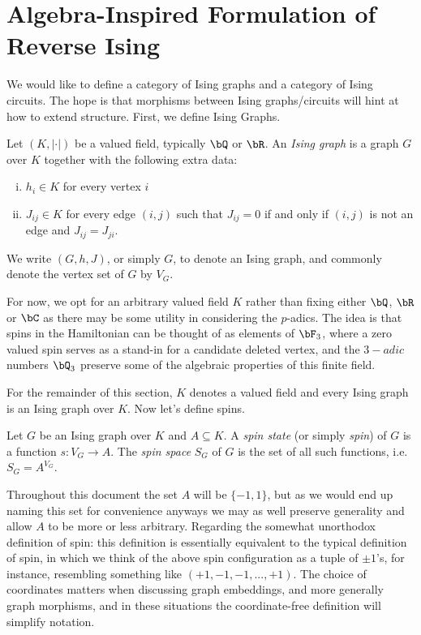 \section*{Algebra-Inspired Formulation of Reverse Ising}
We would like to define a category of Ising graphs and a category of Ising circuits. The hope is that morphisms between Ising graphs/circuits will hint at how to extend structure. First, we define Ising Graphs.
\begin{defn}\label{defn:ising-graph}
	Let $(K,|\cdot|)$ be a valued field, typically $\bQ$ or $\bR$. An \emph{Ising graph} is a graph $G$ over $K$ together with the following extra data:
	\begin{enumerate}[(i)]
		\item $h_i \in K$ for every vertex $i$
		\item $J_{ij} \in K$ for every edge $(i,j)$ such that $J_{ij} = 0$ if and only if  $(i,j)$ is not an edge and $J_{ij} = J_{ji}$.
	\end{enumerate}
	We write $(G,h,J)$, or simply $G$, to denote an Ising graph, and commonly denote the vertex set of $G$ by $V_G$.
\end{defn}
\begin{rmk}\label{rmk:generality-in-ising-graph}
	For now, we opt for an arbitrary valued field $K$ rather than fixing either $\bQ$, $\bR$ or $\bC$ as there may be some utility in considering the $p$-adics. The idea is that spins in the Hamiltonian can be thought of as elements of $\bF_3$, where a zero valued spin serves as a stand-in for a candidate deleted vertex, and the $3-adic$ numbers $\bQ_3$ preserve some of the algebraic properties of this finite field.
\end{rmk}
For the remainder of this section, $K$ denotes a valued field and every Ising graph is an Ising graph over $K$. Now let's define spins.
\begin{defn}\label{defn:spin-space}
	Let $G$ be an Ising graph over $K$ and $A\subseteq K$. A \emph{spin state} (or simply \emph{spin}) of $G$ is a function $s:V_G\to A$. The \emph{spin space} $S_G$ of $G$ is the set of all such functions, i.e. $S_G = A^{V_G}$.
\end{defn}
\begin{rmk}\label{rmk:spin-intuition}
	Throughout this document the set $A$ will be $\{-1,1\}$, but as we would end up naming this set for convenience anyways we may as well preserve generality and allow $A$ to be more or less arbitrary. Regarding the somewhat unorthodox definition of spin: this definition is essentially equivalent to the typical definition of spin, in which we think of the above spin configuration as a tuple of $\pm 1$'s, for instance, resembling something like $(+1,-1,-1,...,+1)$. The choice of coordinates matters when discussing graph embeddings, and more generally graph morphisms, and in these situations the coordinate-free definition will simplify notation.
\end{rmk}

